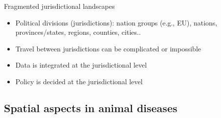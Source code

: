 \documentclass[aspectratio=43]{beamer}
\begin{document}







{
\begin{frame}{Fragmented jurisdictional landscapes}
	\begin{itemize}
		\item  Political divisions (jurisdictions): nation groups (e.g., EU), nations, provinces/states, regions, counties, cities..
		\vfill
		\item Travel between jurisdictions can be complicated or impossible
		\vfill
		\item Data is integrated at the jurisdictional level
		\vfill
		\item Policy is decided at the jurisdictional level
	\end{itemize}
\end{frame}
}










\subsection{Spatial aspects in animal diseases}
\end{document}
